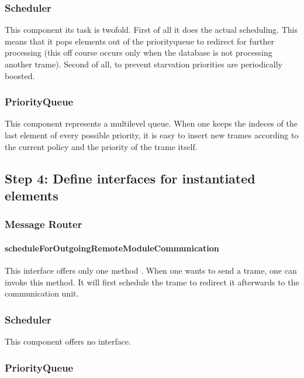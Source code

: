 \subsubsection{Scheduler}

\npar This component its task is twofold. First of all it does the actual
scheduling. This means that it pops elements out of the priorityqueue to
redirect for further processing (this off course occurs only when the database
is not processing another trame). Second of all, to prevent starvation
priorities are periodically boosted.

\subsubsection{PriorityQueue}

\npar This component represents a multilevel queue. When one keeps the indeces
of the last element of every possible priority, it is easy to insert new trames
according to the current policy and the priority of the trame itself.

\subsection{Step 4: Define interfaces for instantiated elements}
\label{add:it6/interfaces}

\subsubsection{Message Router}

\paragraph{scheduleForOutgoingRemoteModuleCommunication} %

\npar This interface offers only one method . When one
wants to send a trame, one can invoke this method. It will first schedule
the trame to redirect it afterwards to the communication unit.

\subsubsection{Scheduler}

\npar This component offers no interface.

\subsubsection{PriorityQueue}

